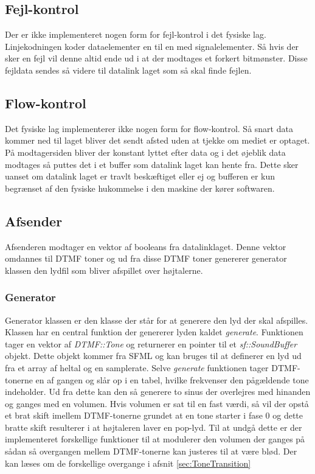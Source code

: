 \subsection{Fejl-kontrol}
Der er ikke implementeret nogen form for fejl-kontrol i det fysiske lag. Linjekodningen koder dataelementer en til en med signalelementer. Så hvis der sker en fejl vil denne altid ende ud i at der modtages et forkert bitmønster. Disse fejldata sendes så videre til datalink laget som så skal finde fejlen.

\subsection{Flow-kontrol}
Det fysiske lag implementerer ikke nogen form for flow-kontrol. Så snart data kommer ned til laget bliver det sendt afsted uden at tjekke om mediet er optaget. På modtagersiden bliver der konstant lyttet efter data og i det øjeblik data modtages så puttes det i et buffer som datalink laget kan hente fra. Dette sker uanset om datalink laget er travlt beskæftiget eller ej og bufferen er kun begrænset af den fysiske hukommelse i den maskine der kører softwaren.

\subsection{Afsender}
Afsenderen modtager en vektor af booleans fra datalinklaget. Denne vektor omdannes til DTMF toner og ud fra disse DTMF toner genererer generator klassen den lydfil som bliver afspillet over højtalerne.

\subsubsection{Generator}
Generator klassen er den klasse der står for at generere den lyd der skal afspilles. Klassen har en central funktion der genererer lyden kaldet \textit{generate}. Funktionen tager en vektor af \textit{DTMF::Tone} og returnerer en pointer til et \textit{sf::SoundBuffer} objekt. Dette objekt kommer fra SFML og kan bruges til at definerer en lyd ud fra et array af heltal og en samplerate. Selve \textit{generate} funktionen tager DTMF-tonerne en af gangen og slår op i en tabel, hvilke frekvenser den pågældende tone indeholder. Ud fra dette kan den så generere to sinus der overlejres med hinanden og ganges med en volumen. Hvis volumen er sat til en fast værdi, så vil der opstå et brat skift imellem DTMF-tonerne grundet at en tone starter i fase 0 og dette bratte skift resulterer i at højtaleren laver en pop-lyd. Til at undgå dette er der implementeret forskellige funktioner til at modulerer den volumen der ganges på sådan så overgangen mellem DTMF-tonerne kan justeres til at være blød. Der kan læses om de forskellige overgange i afsnit \ref{sec:ToneTransition}


